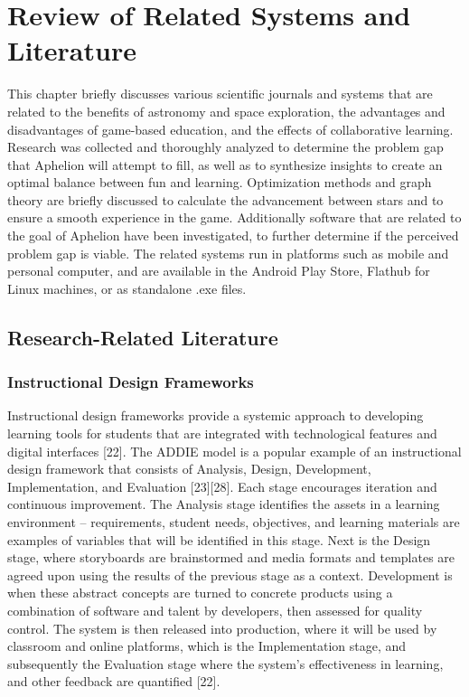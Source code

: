 \chapter{Review of Related Systems and Literature}

This chapter briefly discusses various scientific journals and systems that are related to the benefits of astronomy and space 
exploration, the advantages and disadvantages of game-based education, and the effects of collaborative learning. Research was
 collected and thoroughly analyzed to determine the problem gap that Aphelion will attempt to fill, as well as to synthesize 
 insights to create an optimal balance between fun and learning. Optimization methods and graph theory are briefly discussed 
 to calculate the advancement between stars and to ensure a smooth experience in the game. Additionally software that are 
 related to the goal of Aphelion have been investigated, to further determine if the perceived problem gap is viable. The 
 related systems run in platforms such as mobile and personal computer, and are available in the Android Play Store, Flathub 
 for Linux machines, or as standalone .exe files.


\section{Research-Related Literature}

\subsection{Instructional Design Frameworks}

Instructional design frameworks provide a systemic approach to developing learning tools for students that are 
integrated with technological features and digital interfaces [22]. The ADDIE model is a popular example of an 
instructional design framework that consists of Analysis, Design, Development, Implementation, and Evaluation [23][28]. 
Each stage encourages iteration and continuous improvement. The Analysis stage identifies the assets in a learning 
environment – requirements, student needs, objectives, and learning materials are examples of variables that will be 
identified in this stage. Next is the Design stage, where storyboards are brainstormed and media formats and templates 
are agreed upon using the results of the previous stage as a context. Development is when these abstract concepts are 
turned to concrete products using a combination of software and talent by developers, then assessed for quality control. 
The system is then released into production, where it will be used by classroom and online platforms, which is the 
Implementation stage, and subsequently the Evaluation stage where the system’s effectiveness in learning, and other 
feedback are quantified [22].

